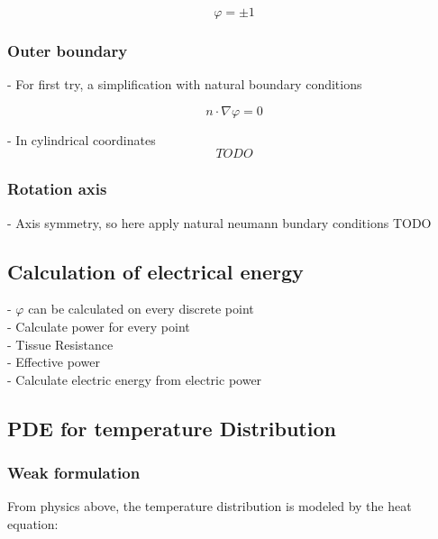\documentclass[parskip=half, titlepage=yes, 12pt, BCOR=12mm, DIV=calc]{scrartcl}
\begin{document}
\begin{equation}
    \varphi = \pm 1
\end{equation}


\subsubsection{Outer boundary}

- For first try, a simplification with natural boundary conditions

\begin{equation}
    n \cdot \nabla \varphi = 0
\end{equation}

- In cylindrical coordinates
\begin{equation}
    TODO
\end{equation}

\subsubsection{Rotation axis}

- Axis symmetry, so here apply natural neumann bundary conditions TODO \\


\subsection{Calculation of electrical energy}

- $\varphi$ can be calculated on every discrete point \\
- Calculate power for every point \\
- Tissue Resistance \\
- Effective power \\
- Calculate electric energy from electric power \\




\subsection{PDE for temperature Distribution}

\subsubsection{Weak formulation}

From physics above, the temperature distribution is modeled by the heat equation: 
\end{document}
